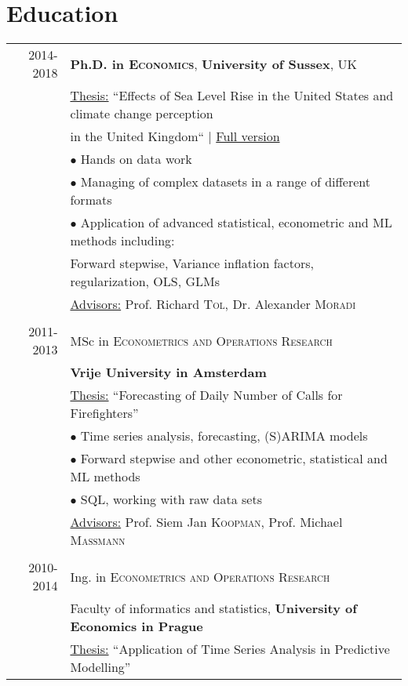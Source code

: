 \documentclass[a4paper,10pt]{article}
\begin{document}
\section{Education}
\begin{tabular}{rl}	
 2014-2018 & \textbf{Ph.D. in \textsc{Economics}}, \textbf{University of Sussex}, UK\\
& \underline{Thesis:} ``Effects of Sea Level Rise in the United States and climate change perception\\

& in the United Kingdom`` \hfill | \href{http://sro.sussex.ac.uk/76891/}{Full version}\\
& \hspace{0.5cm} $\bullet$ Hands on data work\\
& \hspace{0.5cm} $\bullet$ Managing of complex datasets in a range of different formats\\
& \hspace{0.5cm} $\bullet$ Application of advanced statistical, econometric and ML methods including:\\
& \hspace{0.9cm}Forward stepwise, Variance inflation factors, regularization, OLS, GLMs\\
& \underline{Advisors:} Prof. Richard \textsc{Tol}, Dr. Alexander \textsc{Moradi}\\&\\



2011-2013& MSc in \textsc{Econometrics and Operations Research} \\&\textbf{Vrije University in Amsterdam}\\
& \underline{Thesis:} ``Forecasting of Daily Number of Calls for Firefighters''\\ 
& \hspace{0.5cm} $\bullet$ Time series analysis, forecasting, (S)ARIMA models\\
& \hspace{0.5cm} $\bullet$ Forward stepwise and other econometric, statistical and ML methods\\
& \hspace{0.5cm} $\bullet$ SQL, working with raw data sets\\
& \underline{Advisors:} Prof. Siem Jan \textsc{Koopman}, Prof. Michael \textsc{Massmann}\\&\\

2010-2014& Ing. in \textsc{Econometrics and Operations Research} \\&Faculty of informatics and statistics, \textbf{University of Economics in Prague}\\
& \underline{Thesis:} ``Application of Time Series Analysis in Predictive Modelling''\\ 
\end{tabular}
\end{document}
